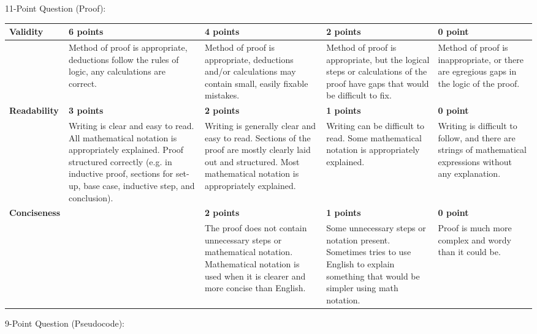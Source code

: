 \documentclass[12pt,landscape]{article}
\begin{document}
\newpage

{\large 11-Point Question (Proof):}


{\renewcommand{\arraystretch}{2}
\begin{tabular}{|p{2.3cm}|p{4.2cm}|p{4.2cm}|p{4.2cm}|p{4.2cm}|}
\hline
{\bf Validity } & {\bf 6 points} & {\bf 4 points} & {\bf 2 points} & {\bf 0 point} \\
\hline
& 
Method of proof is appropriate, deductions follow the rules of logic, any calculations are correct. & 
Method of proof is appropriate, deductions and/or calculations may contain small, easily fixable mistakes. & 
Method of proof is appropriate, but the logical steps or calculations of the proof have gaps that would be difficult to fix. & 
Method of proof is inappropriate, or there are egregious gaps in the logic of the proof.\\
\hline
{\bf Readability } & {\bf 3 points} & {\bf 2 points} & {\bf 1 points} & {\bf 0 point} \\
\hline
& 
 Writing is clear and easy to read. All mathematical notation is appropriately explained. Proof structured correctly (e.g. in inductive proof, sections for set-up, base case, inductive step, and conclusion). & 
 Writing is generally clear and easy to read. Sections of the proof are mostly clearly laid out and structured. Most mathematical notation is appropriately explained.& 
 Writing can be difficult to read. Some mathematical notation is appropriately explained. & 
 Writing is difficult to follow, and there are strings of mathematical expressions without any explanation.\\
\hline
{\bf Conciseness} & & {\bf 2 points} & {\bf 1 points} & {\bf 0 point} \\
\hline
 &

&
The proof does not contain unnecessary steps or mathematical notation. Mathematical notation is used when it is clearer and more concise than English.
&
Some unnecessary steps or notation present. Sometimes tries to use English to explain something that would be simpler using math notation.
&
Proof is much more complex and wordy than it could be.\\
\hline
 \end{tabular}
}




\newpage

{\large 9-Point Question (Pseudocode):}
\end{document}

